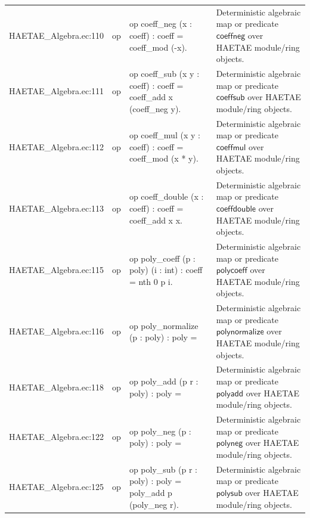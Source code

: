 \documentclass[10pt]{article}
\begin{document}
\begin{longtable}{L{0.11\textwidth}L{0.055\textwidth}L{0.385\textwidth}L{0.41\textwidth}}
HAETAE\_\allowbreak{}Algebra.\allowbreak{}ec:\allowbreak{}110 & op & {\ttfamily\scriptsize op coeff\_\allowbreak{}neg (x : coeff) : coeff = coeff\_\allowbreak{}mod (-x).} & Deterministic algebraic map or predicate $\mathsf{coeffneg}$ over HAETAE module/ring objects. \\
HAETAE\_\allowbreak{}Algebra.\allowbreak{}ec:\allowbreak{}111 & op & {\ttfamily\scriptsize op coeff\_\allowbreak{}sub (x y : coeff) : coeff = coeff\_\allowbreak{}add x (coeff\_\allowbreak{}neg y).} & Deterministic algebraic map or predicate $\mathsf{coeffsub}$ over HAETAE module/ring objects. \\
HAETAE\_\allowbreak{}Algebra.\allowbreak{}ec:\allowbreak{}112 & op & {\ttfamily\scriptsize op coeff\_\allowbreak{}mul (x y : coeff) : coeff = coeff\_\allowbreak{}mod (x * y).} & Deterministic algebraic map or predicate $\mathsf{coeffmul}$ over HAETAE module/ring objects. \\
HAETAE\_\allowbreak{}Algebra.\allowbreak{}ec:\allowbreak{}113 & op & {\ttfamily\scriptsize op coeff\_\allowbreak{}double (x : coeff) : coeff = coeff\_\allowbreak{}add x x.} & Deterministic algebraic map or predicate $\mathsf{coeffdouble}$ over HAETAE module/ring objects. \\
HAETAE\_\allowbreak{}Algebra.\allowbreak{}ec:\allowbreak{}115 & op & {\ttfamily\scriptsize op poly\_\allowbreak{}coeff (p : poly) (i : int) : coeff = nth 0 p i.} & Deterministic algebraic map or predicate $\mathsf{polycoeff}$ over HAETAE module/ring objects. \\
HAETAE\_\allowbreak{}Algebra.\allowbreak{}ec:\allowbreak{}116 & op & {\ttfamily\scriptsize op poly\_\allowbreak{}normalize (p : poly) : poly =} & Deterministic algebraic map or predicate $\mathsf{polynormalize}$ over HAETAE module/ring objects. \\
HAETAE\_\allowbreak{}Algebra.\allowbreak{}ec:\allowbreak{}118 & op & {\ttfamily\scriptsize op poly\_\allowbreak{}add (p r : poly) : poly =} & Deterministic algebraic map or predicate $\mathsf{polyadd}$ over HAETAE module/ring objects. \\
HAETAE\_\allowbreak{}Algebra.\allowbreak{}ec:\allowbreak{}122 & op & {\ttfamily\scriptsize op poly\_\allowbreak{}neg (p : poly) : poly =} & Deterministic algebraic map or predicate $\mathsf{polyneg}$ over HAETAE module/ring objects. \\
HAETAE\_\allowbreak{}Algebra.\allowbreak{}ec:\allowbreak{}125 & op & {\ttfamily\scriptsize op poly\_\allowbreak{}sub (p r : poly) : poly = poly\_\allowbreak{}add p (poly\_\allowbreak{}neg r).} & Deterministic algebraic map or predicate $\mathsf{polysub}$ over HAETAE module/ring objects. \\

\end{longtable}
\end{document}
